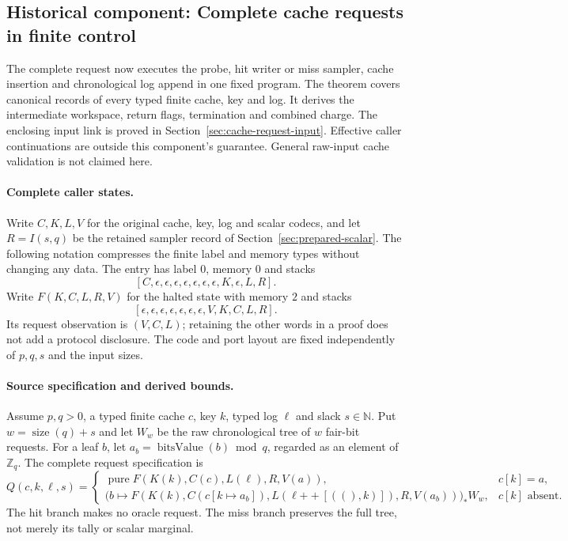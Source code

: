 \documentclass[11pt]{article}
\begin{document}
\subsection{Historical component: Complete cache requests in finite control}\label{sec:cache-dispatch}
The complete request now executes the probe, hit writer or miss sampler,
cache insertion and chronological log append in one fixed program.
The theorem
covers canonical records of every typed finite cache, key and log.
It derives
the intermediate workspace, return flags, termination and combined charge.
The enclosing input link is proved in Section~\ref{sec:cache-request-input}.
Effective caller continuations are outside this component's guarantee.
General raw-input cache validation
is not claimed here.

\paragraph{Complete caller states.}
Write $C,K,L,V$ for the original cache, key, log and scalar codecs, and let
$R=I(s,q)$ be the retained sampler record of Section~\ref{sec:prepared-scalar}.
The following notation compresses the finite label and memory types without
changing any data.
The entry has label $0$, memory $0$ and stacks
\[
 [C,\epsilon,\epsilon,\epsilon,\epsilon,\epsilon,\epsilon,\epsilon,
   K,\epsilon,L,R].
\]
Write $F(K,C,L,R,V)$ for the halted state with memory $2$ and stacks
\[
 [\epsilon,\epsilon,\epsilon,\epsilon,\epsilon,\epsilon,\epsilon,V,K,C,L,R].
\]
Its request observation is $(V,C,L)$; retaining the other words in a proof does
not add a protocol disclosure.
The code and port layout are fixed independently
of $p,q,s$ and the input sizes.

\paragraph{Source specification and derived bounds.}
Assume $p,q>0$, a typed finite cache $c$, key $k$, typed log $\ell$ and slack
$s\in\mathbb N$.
Put $w=\operatorname{size}(q)+s$ and let $W_w$ be the raw
chronological tree of $w$ fair-bit requests.
For a leaf $b$, let
$a_b=\operatorname{bitsValue}(b)\bmod q$, regarded as an element of
$\mathbb Z_q$.
The complete request specification is
\[
 Q(c,k,\ell,s)=
 \begin{cases}
  \operatorname{pure}F(K(k),C(c),L(\ell),R,V(a)),&c[k]=a,\\
  \bigl(b\mapsto F(K(k),C(c[k\mapsto a_b]),
       L(\ell\mathbin{+\!+}[((),k)]),R,V(a_b))\bigr)_*W_w,&c[k]\text{ absent}.
 \end{cases}
\]
The hit branch makes no oracle request.
The miss branch preserves the full tree,
not merely its tally or scalar marginal.
\end{document}

